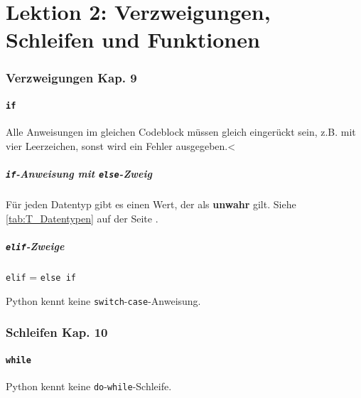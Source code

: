 \part*{Lektion 2: Verzweigungen, Schleifen und Funktionen}
\section[Verzweigungen]{Verzweigungen \tiny{Kap. 9}}
\subsection{\texttt{if}}

\begin{achtung}
	Alle Anweisungen im gleichen Codeblock müssen gleich eingerückt sein, z.B. mit vier Leerzeichen, sonst wird ein Fehler ausgegeben.<
\end{achtung}

\subsubsection{\texttt{if}-Anweisung mit \texttt{else}-Zweig}

Für jeden Datentyp gibt es einen Wert, der als \textbf{unwahr} gilt. Siehe \autoref{tab:T_Datentypen} auf der Seite \pageref{tab:T_Datentypen}.

\subsubsection{\texttt{elif}-Zweige}

\texttt{elif} = \texttt{else if}\\

\begin{achtung}
	Python kennt keine \texttt{switch}-\texttt{case}-Anweisung.
\end{achtung}

\section[Schleifen]{Schleifen \tiny{Kap. 10}}
\subsection{\texttt{while}}


\begin{achtung}
	Python kennt keine \texttt{do}-\texttt{while}-Schleife.
\end{achtung}

